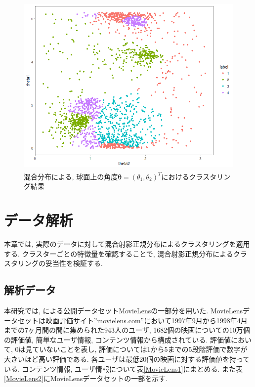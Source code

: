 \documentclass[a4j,12pt]{jarticle}
\begin{document}
\begin{figure}[H]
\begin{center}
\includegraphics[clip,height=90mm]{data/pred.png}
\end{center}
\caption{混合分布による, 球面上の角度$\bm \theta = (\theta_1, \theta_2)^T$におけるクラスタリング結果}
\label{clusterplot2d_sim}
\end{figure}

\section{データ解析}

本章では, 実際のデータに対して混合射影正規分布によるクラスタリングを適用する. クラスターごとの特徴量を確認することで, 混合射影正規分布によるクラスタリングの妥当性を検証する.

\subsection{解析データ}

本研究では, \citet{MovieLens}による公開データセットMovieLensの一部分を用いた. MovieLensデータセットは映画評価サイト''movielens.com''において1997年9月から1998年4月までの7ヶ月間の間に集められた943人のユーザ, 1682個の映画についての10万個の評価値, 簡単なユーザ情報, コンテンツ情報から構成されている. 評価値において, $0$は見ていないことを表し, 評価については1から5までの5段階評価で数字が大きいほど高い評価である. 各ユーザは最低20個の映画に対する評価値を持っている. コンテンツ情報, ユーザ情報について表\ref{MovieLens1}にまとめる. また表\ref{MovieLens2}にMovieLensデータセットの一部を示す.
\end{document}

